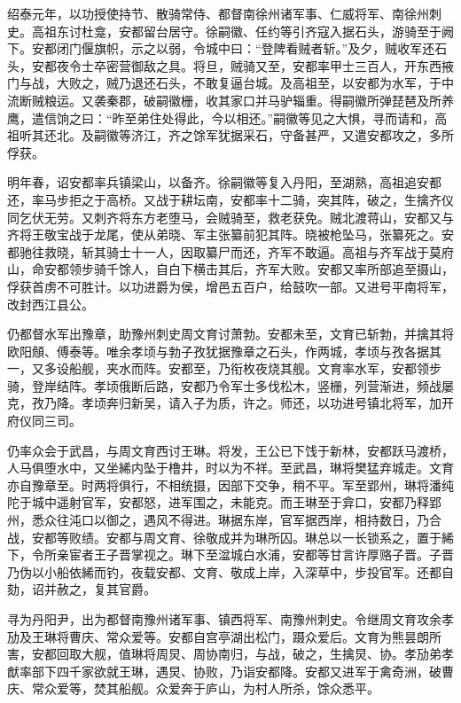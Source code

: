 \documentclass[]{article}
\begin{document}
绍泰元年，以功授使持节、散骑常侍、都督南徐州诸军事、仁威将军、南徐州刺史。高祖东讨杜龛，安都留台居守。徐嗣徽、任约等引齐寇入据石头，游骑至于阙下。安都闭门偃旗帜，示之以弱，令城中曰：``登陴看贼者斩。''及夕，贼收军还石头，安都夜令士卒密营御敌之具。将旦，贼骑又至，安都率甲士三百人，开东西掖门与战，大败之，贼乃退还石头，不敢复逼台城。及高祖至，以安都为水军，于中流断贼粮运。又袭秦郡，破嗣徽栅，收其家口并马驴辎重。得嗣徽所弹琵琶及所养鹰，遣信饷之曰：``昨至弟住处得此，今以相还。''嗣徽等见之大惧，寻而请和，高祖听其还北。及嗣徽等济江，齐之馀军犹据采石，守备甚严，又遣安都攻之，多所俘获。

明年春，诏安都率兵镇梁山，以备齐。徐嗣徽等复入丹阳，至湖熟，高祖追安都还，率马步拒之于高桥。又战于耕坛南，安都率十二骑，突其阵，破之，生擒齐仪同乞伏无劳。又刺齐将东方老堕马，会贼骑至，救老获免。贼北渡蒋山，安都又与齐将王敬宝战于龙尾，使从弟晓、军主张纂前犯其阵。晓被枪坠马，张纂死之。安都驰往救晓，斩其骑士十一人，因取纂尸而还，齐军不敢逼。高祖与齐军战于莫府山，命安都领步骑千馀人，自白下横击其后，齐军大败。安都又率所部追至摄山，俘获首虏不可胜计。以功进爵为侯，增邑五百户，给鼓吹一部。又进号平南将军，改封西江县公。

仍都督水军出豫章，助豫州刺史周文育讨萧勃。安都未至，文育已斩勃，并擒其将欧阳頠、傅泰等。唯余孝顷与勃子孜犹据豫章之石头，作两城，孝顷与孜各据其一，又多设船舰，夹水而阵。安都至，乃衔枚夜烧其舰。文育率水军，安都领步骑，登岸结阵。孝顷俄断后路，安都乃令军士多伐松木，竖栅，列营渐进，频战屡克，孜乃降。孝顷奔归新吴，请入子为质，许之。师还，以功进号镇北将军，加开府仪同三司。

仍率众会于武昌，与周文育西讨王琳。将发，王公已下饯于新林，安都跃马渡桥，人马俱堕水中，又坐絺内坠于橹井，时以为不祥。至武昌，琳将樊猛弃城走。文育亦自豫章至。时两将俱行，不相统摄，因部下交争，稍不平。军至郢州，琳将潘纯陀于城中遥射官军，安都怒，进军围之，未能克。而王琳至于弇口，安都乃释郢州，悉众往沌口以御之，遇风不得进。琳据东岸，官军据西岸，相持数日，乃合战，安都等败绩。安都与周文育、徐敬成并为琳所囚。琳总以一长锁系之，置于絺下，令所亲宦者王子晋掌视之。琳下至湓城白水浦，安都等甘言许厚赂子晋。子晋乃伪以小船依絺而钓，夜载安都、文育、敬成上岸，入深草中，步投官军。还都自劾，诏并赦之，复其官爵。

寻为丹阳尹，出为都督南豫州诸军事、镇西将军、南豫州刺史。令继周文育攻余孝劢及王琳将曹庆、常众爱等。安都自宫亭湖出松门，蹑众爱后。文育为熊昙朗所害，安都回取大舰，值琳将周炅、周协南归，与战，破之，生擒炅、协。孝劢弟孝猷率部下四千家欲就王琳，遇炅、协败，乃诣安都降。安都又进军于禽奇洲，破曹庆、常众爱等，焚其船舰。众爱奔于庐山，为村人所杀，馀众悉平。
\end{document}
